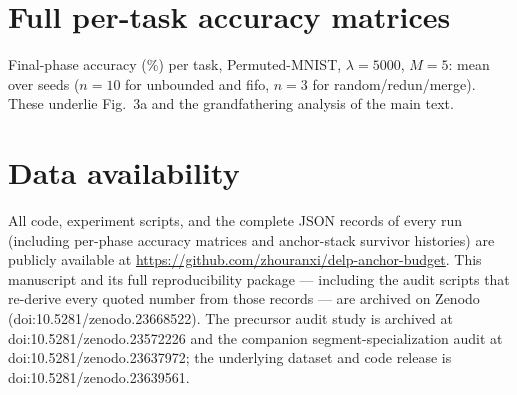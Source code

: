 \documentclass[11pt]{article}
\begin{document}
\section{Full per-task accuracy matrices}
\label{appx:matrices}

\begin{sloppypar}
Final-phase accuracy (\%) per task, Permuted-MNIST, $\lambda{=}5000$,
$M{=}5$: mean over seeds ($n{=}10$ for unbounded and fifo, $n{=}3$ for
random/redun/merge). These underlie Fig.~3a and the grandfathering
analysis of the main text.
\end{sloppypar}

\begin{table}[h]
\centering\small
\caption{$T{=}10$.}
\label{tab:appx-t10}

\end{table}

\begin{table}[h]
\centering\small
\caption{$T{=}20$.}
\label{tab:appx-t20}

\end{table}

\section*{Data availability}
All code, experiment scripts, and the complete JSON records of every
run (including per-phase accuracy matrices and anchor-stack survivor
histories) are publicly available at
\url{https://github.com/zhouranxi/delp-anchor-budget}. This manuscript
and its full reproducibility package --- including the audit scripts
that re-derive every quoted number from those records --- are archived
on Zenodo (doi:10.5281/zenodo.23668522). The precursor audit study is
archived at doi:10.5281/zenodo.23572226 and the companion
segment-specialization audit at doi:10.5281/zenodo.23637972; the
underlying dataset and code release is
doi:10.5281/zenodo.23639561.



\end{document}
